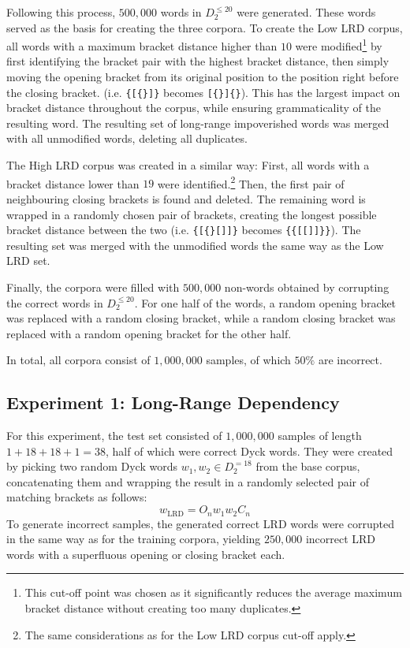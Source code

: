 Following this process, $500{,}000$ words in $D_{2}^{\leq 20}$ were generated. These words served as the basis for creating the three corpora. To create the Low LRD corpus, all words with a maximum bracket distance higher than $10$ were modified\footnote{This cut-off point was chosen as it significantly reduces the average maximum bracket distance without creating too many duplicates.} by first identifying the bracket pair with the highest bracket distance, then simply moving the opening bracket from its original position to the position right before the closing bracket. (i.e. \texttt{\{[\{\}]\}} becomes \texttt{[\{\}]\{\}}). This has the largest impact on bracket distance throughout the corpus, while ensuring grammaticality of the resulting word. The resulting set of long-range impoverished words was merged with all unmodified words, deleting all duplicates.

The High LRD corpus was created in a similar way: First, all words with a bracket distance lower than $19$ were identified.\footnote{The same considerations as for the Low LRD corpus cut-off apply.} Then, the first pair of neighbouring closing brackets is found and deleted. The remaining word is wrapped in a randomly chosen pair of brackets, creating the longest possible bracket distance between the two (i.e. \texttt{\{[\{\}[]]\}} becomes \texttt{\{\{[[]]\}\}}). The resulting set was merged with the unmodified words the same way as the Low LRD set.


Finally, the corpora were filled with $500{,}000$ non-words obtained by corrupting the correct words in $D_{2}^{\leq 20}$. For one half of the words, a random opening bracket was replaced with a random closing bracket, while a random closing bracket was replaced with a random opening bracket for the other half.

In total, all corpora consist of $1{,}000{,}000$ samples, of which $50\%$ are incorrect.

\subsection{Experiment 1: Long-Range Dependency}\label{LRD}
For this experiment, the test set consisted of $1{,}000{,}000$ samples of length $1+18+18+1=38$, half of which were correct Dyck words. They were created by picking two random Dyck words $w_{1}, w_{2} \in D_{2}^{=18}$ from the base corpus, concatenating them and wrapping the result in a randomly selected pair of matching brackets as follows:
\[
	w_{\text{LRD}} = O_{n}w_{1}w_{2}C_{n}
\]
To generate incorrect samples, the generated correct LRD words were corrupted in the same way as for the training corpora, yielding $250{,}000$ incorrect LRD words with a superfluous opening or closing bracket each.


